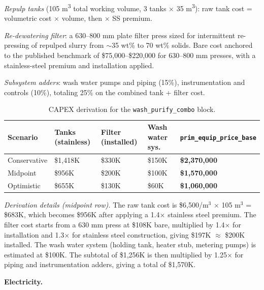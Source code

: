 \textit{Repulp tanks} (105 \si{m^3} total working volume, 3 tanks $\times$ 35 \si{m^3}): raw tank cost = volumetric cost $\times$ volume, then $\times$ SS premium.

\textit{Re-dewatering filter}: a 630--800 mm plate filter press sized for intermittent re-pressing of repulped slurry from $\sim$35 wt\% to 70 wt\% solids. Bare cost anchored to the published benchmark of \$75,000--\$220,000 for 630--800 mm presses, with a stainless-steel premium and installation applied.

\textit{Subsystem adders}: wash water pumps and piping (15\%), instrumentation and controls (10\%), totaling 25\% on the combined tank + filter cost.

\begin{table}[h!]
\caption{CAPEX derivation for the \texttt{wash\_purify\_combo} block.}
\centering
\begin{tabular}{>{\raggedright\arraybackslash}p{2.2cm}
				>{\raggedright\arraybackslash}p{2.5cm}
				>{\raggedright\arraybackslash}p{2.3cm}
				>{\raggedright\arraybackslash}p{2.4cm}
				>{\raggedright\arraybackslash}p{3.5cm}}

\toprule
\textbf{Scenario} & \textbf{Tanks (stainless)} & \textbf{Filter (installed)} & \textbf{Wash water sys.} &  \texttt{prim\_equip\_price\_base} \\
\midrule
Conservative & \$1,418K & \$330K & \$150K & \textbf{\$2,370,000} \\
Midpoint     & \$956K   & \$200K & \$100K & \textbf{\$1,570,000} \\
Optimistic   & \$655K   & \$130K & \$60K  & \textbf{\$1,060,000} \\
\bottomrule
\end{tabular}
\end{table}

\noindent \textit{Derivation details (midpoint row).} The raw tank cost is \$6,500/m$^3$ $\times$ 105 m$^3$ = \$683K, which becomes \$956K after applying a 1.4$\times$ stainless steel premium. The filter cost starts from a 630 mm press at \$108K bare, multiplied by 1.4$\times$ for installation and 1.3$\times$ for stainless steel construction, giving \$197K $\approx$ \$200K installed. The wash water system (holding tank, heater stub, metering pumps) is estimated at \$100K. The subtotal of \$1,256K is then multiplied by 1.25$\times$ for piping and instrumentation adders, giving a total of \$1,570K.

\medskip
\noindent\textbf{Electricity.}\quad

